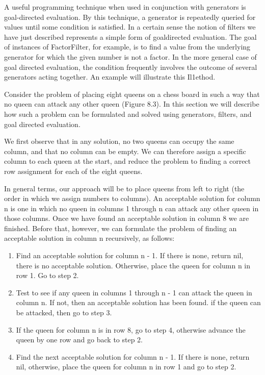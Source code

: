 
A useful programming technique when used in conjunction with generators is
goal-directed evaluation. By this technique, a generator is repeatedly queried
for values until some condition is satisfied. In a certain sense the notion of
filters we have just described represents a simple form of goaldirected
evaluation. The goal of instances of FactorFilter, for example, is to find a
value from the underlying generator for which the given number is not a factor.
In the more general case of goal directed evaluation, the condition frequently
involves the outcome of several generators acting together. An example will
illustrate this Il1ethod.

Consider the problem of placing eight queens on a chess board in such a way that
no queen can attack any other queen (Figure 8.3). In this section we will
describe how such a problem can be formulated and solved using generators,
filters, and goal directed evaluation.

We first observe that in any solution, no two queens can occupy the same column,
and that no column can be empty. We can therefore assign a specific column to
each queen at the start, and reduce the problem to finding a correct row
assignment for each of the eight queens.

In general terms, our approach will be to place queens from left to right (the
order in which we assign numbers to columns). An acceptable solution for column
n is one in which no queen in columns 1 through n can attack any other queen in
those columns. Once we have found an acceptable solution in column 8 we are
finished. Before that, however, we can formulate the problem of finding an
acceptable solution in column n recursively, as follows:

\begin{enumerate}
    \item Find an acceptable solution for column n - 1. If there is none, return
    nil, there is no acceptable solution. Otherwise, place the queen for column
    n in row 1. Go to step 2.
    \item Test to see if any queen in columns 1 through n - 1 can attack the
    queen in column n. If not, then an acceptable solution has been found. if
    the queen can be attacked, then go to step 3.
    \item If the queen for column n is in row 8, go to step 4, otherwise advance
    the queen by one row and go back to step 2.
    \item Find the next acceptable solution for column n - 1. If there is none,
    return nil, otherwise, place the queen for column n in row 1 and go to step
    2.
\end{enumerate}

